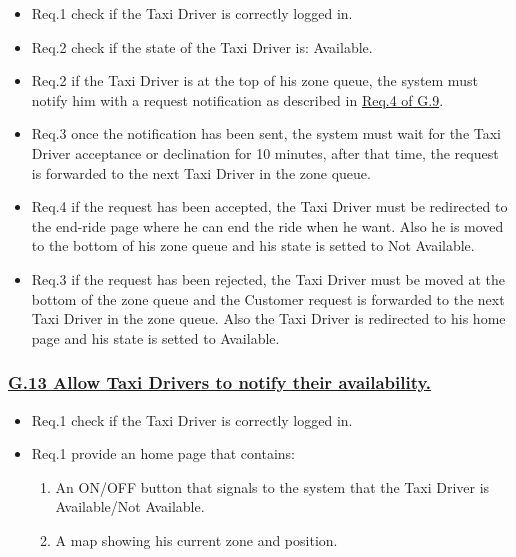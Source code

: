 \documentclass{report}
\begin{document}

				\begin{itemize}
					\item \lbrack Req.1\rbrack \label{sec:fr1_g12} check if the Taxi Driver is correctly logged in.
					\item \lbrack Req.2\rbracl \label{sec:fr2_g12} check if the state of the Taxi Driver is: Available.
					\item \lbrack Req.2\rbrack \label{sec:fr3_g12} if the Taxi Driver is at the top of his zone queue, the system must notify him with a request notification as described in \hyperref[sec:fr4_g9]{Req.4 of G.9}.
					\item \lbrack Req.3\rbrack \label{sec:fr4_g12} once the notification has been sent, the system must wait for the Taxi Driver acceptance or declination for 10 minutes, after that time, the request is forwarded to the next Taxi Driver in the zone queue.
					\item \lbrack Req.4\rbrack \label{sec:fr5_g12} if the request has been accepted, the Taxi Driver must be redirected to the end-ride page where he can end the ride when he want. Also he is moved to the bottom of his zone queue and his state is setted to Not Available.
					\item \lbrack Req.3\rbrack \label{sec:fr6_g12} if the request has been rejected, the Taxi Driver must be moved at the bottom of the zone queue and the Customer request is forwarded to the next Taxi Driver in the zone queue. Also the Taxi Driver is redirected to his home page and his state is setted to Available.
				\end{itemize}


			\subsubsection{\lbrack \hyperref[sec:g13]{G.13 Allow Taxi Drivers to notify their availability.}\rbrack}

				\begin{itemize}
					\item \lbrack Req.1\rbrack \label{sec:fr1_g13} check if the Taxi Driver is correctly logged in.
					\item \lbrack Req.1\rbrack \label{sec:fr1_g13} provide an home page that contains:
						\begin{enumerate}
							\item An ON/OFF button that signals to the system that the Taxi Driver is Available/Not Available.
							\item A map showing his current zone and position.
						\end{enumerate}
				\end{itemize}
\end{document}

